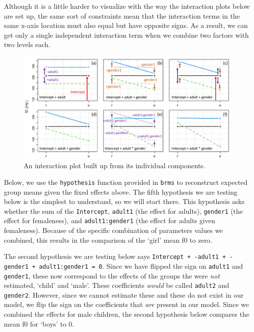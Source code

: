 \documentclass[
]{book}
\begin{document}
Although it is a little harder to visualize with the way the interaction plots below are set up, the same sort of constraints mean that the interaction terms in the same x-axis location must also equal but have opposite signs. As a result, we can get only a single independent interaction term when we combine two factors with two levels each.

\begin{figure}
\includegraphics[width=1\linewidth]{./images/interactionplot} \caption{An interaction plot built up from its individual components.}\label{fig:F4-interactionfig}
\end{figure}

Below, we use the \texttt{hypothesis} function provided in \texttt{brms} to reconstruct expected group means given the fixed effects above. The fifth hypothesis we are testing below is the simplest to understand, so we will start there. This hypothesis asks whether the sum of the \texttt{Intercept}, \texttt{adult1} (the effect for adults), \texttt{gender1} (the effect for femaleness), and \texttt{adult1:gender1} (the effect for adults given femaleness). Because of the specific combination of parameters values we combined, this results in the comparison of the `girl' mean f0 to zero.

The second hypothesis we are testing below says \texttt{Intercept\ +\ -adult1\ +\ -gender1\ +\ adult1:gender1\ =\ 0}. Since we have flipped the sign on \texttt{adult1} and \texttt{gender1}, these now correspond to the effects of the groups the were \emph{not} estimated, `child' and `male'. These coefficients \emph{would} be called \texttt{adult2} and \texttt{gender2}. However, since we cannot estimate these and these do not exist in our model, we flip the sign on the coefficients that \emph{are} present in our model. Since we combined the effects for male children, the second hypothesis below compares the mean f0 for `boys' to 0.
\end{document}
